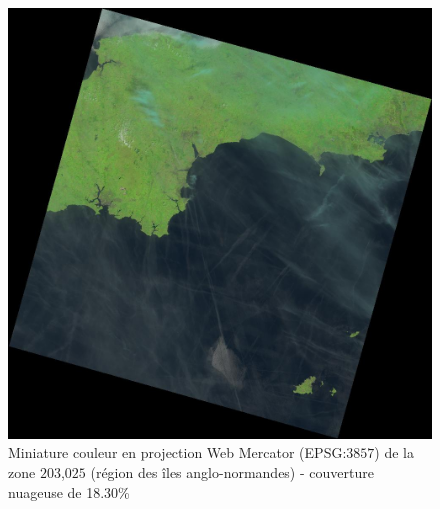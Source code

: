 \documentclass{book}
\begin{document}
\begin{figure}[H]
\begin{center}
\includegraphics[scale=0.2]{images/LC82030252013196LGN00.jpg}
\end{center}
\caption{Miniature couleur en projection Web Mercator (EPSG:$3857$) de la zone $203$,$025$ (région des îles anglo-normandes) - couverture nuageuse de 18.30\%}
\label{cloud3}
\end{figure}
\end{document}
